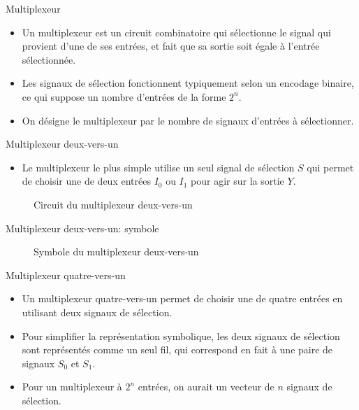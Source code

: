 \documentclass[presentation]{beamer}
\begin{document}
\begin{frame}[label={sec:org70d71ea}]{Multiplexeur}
\begin{itemize}
\item Un multiplexeur est un circuit combinatoire qui sélectionne le signal qui provient d'une de ses entrées, et fait que sa sortie soit égale à l'entrée sélectionnée.

\item Les signaux de sélection fonctionnent typiquement selon un encodage binaire, ce qui suppose un nombre d'entrées de la forme \(2^n\).

\item On désigne le multiplexeur par le nombre de signaux d'entrées à sélectionner.
\end{itemize}
\end{frame}

\begin{frame}[label={sec:orgc3a0f25}]{Multiplexeur deux-vers-un}
\begin{itemize}
\item Le multiplexeur le plus simple utilise un seul signal de sélection \(S\) qui permet de choisir une de deux entrées \(I_0\) ou \(I_1\) pour agir sur la sortie \(Y\).
\end{itemize}

\begin{figure}[htbp]
\centering

\caption{\label{fig:orgae36054}Circuit du multiplexeur deux-vers-un}
\end{figure}
\end{frame}

\begin{frame}[label={sec:org4bd10f3}]{Multiplexeur deux-vers-un: symbole}
\begin{figure}[htbp]
\centering

\caption{\label{fig:orgb19c73a}Symbole du multiplexeur deux-vers-un}
\end{figure}
\end{frame}

\begin{frame}[label={sec:org2e4bd65}]{Multiplexeur quatre-vers-un}
\begin{itemize}
\item Un multiplexeur quatre-vers-un permet de choisir une de quatre entrées en utilisant deux signaux de sélection.

\item Pour simplifier la représentation symbolique, les deux signaux de sélection sont représentés comme un seul fil, qui correspond en fait à une paire de signaux \(S_0\) et \(S_1\).

\item Pour un multiplexeur à \(2^n\) entrées, on aurait un vecteur de \(n\) signaux de sélection.
\end{itemize}
\end{frame}
\end{document}
